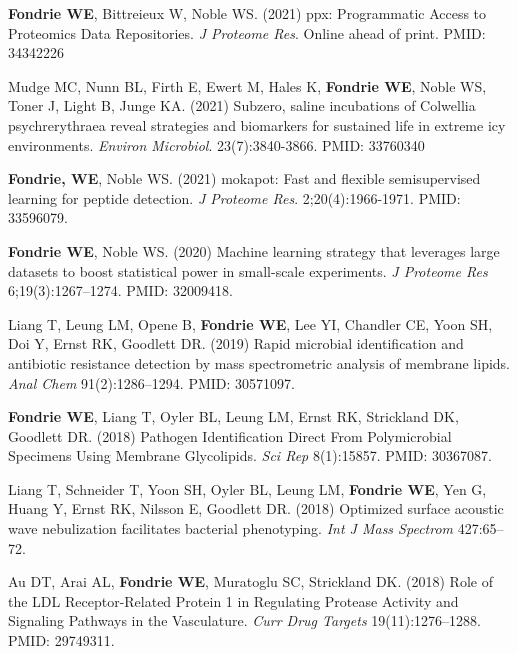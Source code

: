\documentclass[11pt]{article}
\begin{document}
\begin{etaremune}
  \item \textbf{Fondrie WE}, Bittreieux W, Noble WS. (2021) ppx: Programmatic
  Access to Proteomics Data Repositories. \textit{J Proteome Res}. Online ahead
  of print. PMID: 34342226

  \item Mudge MC, Nunn BL, Firth E, Ewert M, Hales K, \textbf{Fondrie WE},
  Noble WS, Toner J, Light B, Junge KA. (2021) Subzero, saline incubations of
  Colwellia psychrerythraea reveal strategies and biomarkers for sustained life
  in extreme icy environments. \textit{Environ Microbiol}. 23(7):3840-3866.
  PMID: 33760340

  \item \textbf{Fondrie, WE}, Noble WS. (2021) mokapot: Fast and flexible
  semisupervised learning for peptide detection. \textit{J Proteome Res}.
  2;20(4):1966-1971. PMID: 33596079.

  \item \textbf{Fondrie WE}, Noble WS. (2020) Machine learning strategy that
  leverages large datasets to boost statistical power in small-scale
  experiments. \textit{J Proteome Res} 6;19(3):1267--1274. PMID: 32009418.
  
  \item Liang T, Leung LM, Opene B, \textbf{Fondrie WE}, Lee YI, Chandler CE,
  Yoon SH, Doi Y, Ernst RK, Goodlett DR. (2019) Rapid microbial identification
  and antibiotic resistance detection by mass spectrometric analysis of
  membrane lipids. \textit{Anal Chem} 91(2):1286--1294. PMID: 30571097.

  \item \textbf{Fondrie WE}, Liang T, Oyler BL, Leung LM, Ernst RK, Strickland
  DK, Goodlett DR. (2018) Pathogen Identification Direct From Polymicrobial
  Specimens Using Membrane Glycolipids. \textit{Sci Rep} 8(1):15857. PMID:
  30367087.
    
  \item Liang T, Schneider T, Yoon SH, Oyler BL, Leung LM, \textbf{Fondrie WE},
  Yen G, Huang Y, Ernst RK, Nilsson E, Goodlett DR. (2018) Optimized surface
  acoustic wave nebulization facilitates bacterial phenotyping. \textit{Int J
    Mass Spectrom} 427:65--72.
    
  \item Au DT, Arai AL, \textbf{Fondrie WE}, Muratoglu SC, Strickland DK.
  (2018) Role of the LDL Receptor-Related Protein 1 in Regulating Protease
  Activity and Signaling Pathways in the Vasculature. \textit{Curr Drug
    Targets} 19(11):1276--1288. PMID: 29749311.


\end{etaremune}
\end{document}
